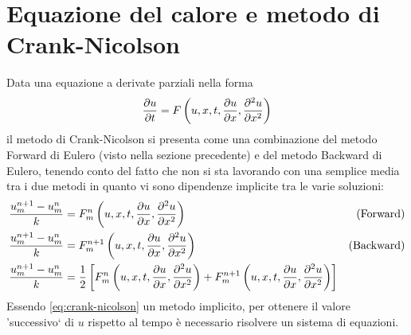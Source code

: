 \documentclass[10pt,a4paper]{article}
\begin{document}

\section{Equazione del calore e metodo di Crank-Nicolson}
\label{sec:2}

Data una equazione a derivate parziali nella forma
\begin{equation}
	\pdv{u}{t} = F\left(u,x,t,\pdv{u}{x},\pdv[2]{u}{x}\right)
\end{equation}
il metodo di Crank-Nicolson si presenta come una combinazione del metodo Forward di Eulero (visto nella sezione precedente) e del metodo Backward di Eulero, tenendo conto del fatto che non si sta lavorando con una semplice media tra i due metodi in quanto vi sono dipendenze implicite tra le varie soluzioni:
\begin{align}
	\frac{u_m^{n+1}-u_m^n}{k} &= F_m^n\left(u,x,t,\pdv{u}{x},\pdv[2]{u}{x}\right) \quad &\text{(Forward)}\\
	\frac{u_m^{n+1}-u_m^n}{k} &= F_m^{n+1}\left(u,x,t,\pdv{u}{x},\pdv[2]{u}{x}\right) \quad &\text{(Backward)}\\
	\frac{u_m^{n+1}-u_m^n}{k} &= \frac{1}{2}\left[F_m^n\left(u,x,t,\pdv{u}{x},\pdv[2]{u}{x}\right) + F_m^{n+1}\left(u,x,t,\pdv{u}{x},\pdv[2]{u}{x}\right)\right] \label{eq:crank-nicolson}
\end{align}
Essendo \eqref{eq:crank-nicolson} un metodo implicito, per ottenere il valore 'successivo` di $u$ rispetto al tempo è necessario risolvere un sistema di equazioni.
\end{document}
